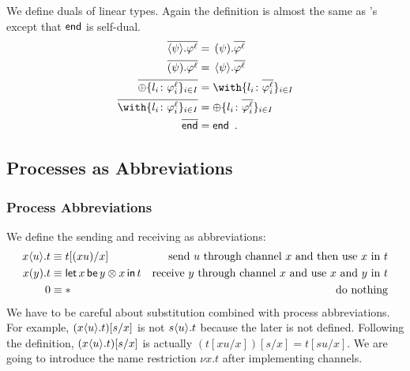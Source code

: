     We define duals of linear types.
    Again the definition is almost the
    same as \citet{wadler2012propositions}'s except that $\mathsf{end}$ is
    self-dual.
    \begin{align*}
     \overline{\sendtype\psi{\phi^\ell}}&= \,\recvtype\psi{\overline{\phi^\ell}}\\
     \overline{\recvtype\psi{\phi^\ell}}&= \,\sendtype\psi{\overline{\phi^\ell}}\\
     \overline{\oplus\{l_i\colon \phi^\ell_i\}_{i\in I}} &=
     \with\{l_i\colon \overline{\phi^\ell_i}\}_{i\in I} \\
     \overline{\with\{l_i\colon \phi^\ell_i\}_{i\in I}} &=
     \oplus\{l_i\colon \overline{\phi^\ell_i}\}_{i\in I} \\
     \overline{\terminate} &= \terminate\enspace.
    \end{align*}

    \subsection{Processes as Abbreviations}

    \subsubsection{Process Abbreviations}
    We define the sending and receiving as abbreviations:
    \begin{align*}
     {x}\langle{u}\rangle.{t} &\equiv t[(xu) /x] &\text{send $u$ through channel
     $x$ and then use $x$ in $t$} \\
     {{x}({y}).{t}} &\equiv \mathsf{let }\,{x}\,\mathsf{ be }\,{y\otimes x}\,\mathsf{ in }\,{t} & \text{receive
     $y$ through channel $x$ and use $x$ and $y$ in $t$} \\
     0 &\equiv \ast &\text{do nothing}
    \end{align*}
    We have to be careful about substitution combined with process
    abbreviations.
    For example, $({x}\langle{u}\rangle.{t})[s/x]$ is not ${s}\langle{u}\rangle.{t}$
    because the later is not defined.  Following the definition,
    $({x}\langle{u}\rangle.{t})[s/x]$ is actually $(t[xu/x])[s/x] = t[su/x]$.
    We are going to introduce the name restriction $\nu x.t$ after
    implementing channels.

